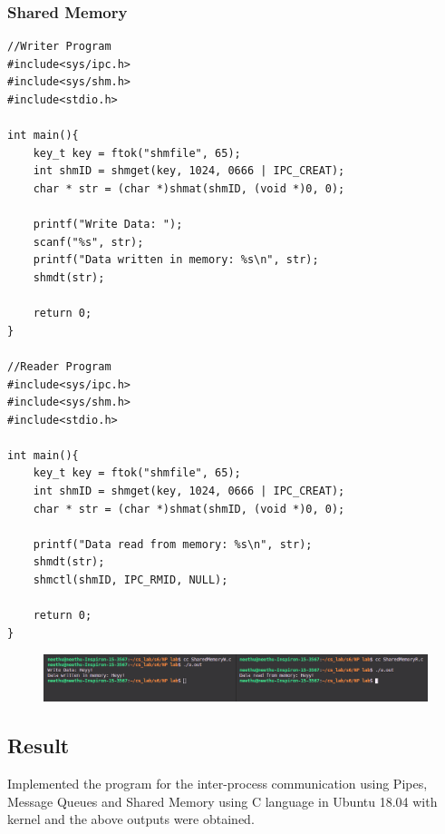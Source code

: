 \subsubsection{Shared Memory}
\begin{verbatim}
//Writer Program
#include<sys/ipc.h>
#include<sys/shm.h>
#include<stdio.h>

int main(){
    key_t key = ftok("shmfile", 65);
    int shmID = shmget(key, 1024, 0666 | IPC_CREAT);
    char * str = (char *)shmat(shmID, (void *)0, 0);

    printf("Write Data: ");
    scanf("%s", str);
    printf("Data written in memory: %s\n", str);
    shmdt(str);

    return 0;
}

//Reader Program
#include<sys/ipc.h>
#include<sys/shm.h>
#include<stdio.h>

int main(){
    key_t key = ftok("shmfile", 65);
    int shmID = shmget(key, 1024, 0666 | IPC_CREAT);
    char * str = (char *)shmat(shmID, (void *)0, 0);

    printf("Data read from memory: %s\n", str);
    shmdt(str);
    shmctl(shmID, IPC_RMID, NULL);

    return 0;
}
\end{verbatim}
\begin{figure}[h]
            \centering
            \includegraphics[scale=0.43]{img/e44.png}
\end{figure}

\subsection{Result}
Implemented the program for the inter-process communication using Pipes, Message Queues and Shared Memory using C language in Ubuntu 18.04 with kernel and the above outputs were obtained.

